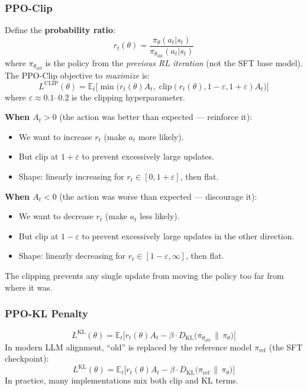 \documentclass[11pt, a4paper]{article}
\begin{document}
\subsubsection{PPO-Clip}

\begin{mathbox}
Define the \textbf{probability ratio}:
\[
r_t(\theta) = \frac{\pi_\theta(a_t | s_t)}{\pi_{\theta_{\text{old}}}(a_t | s_t)}
\]
where $\pi_{\theta_{\text{old}}}$ is the policy from the \emph{previous RL iteration} (not the SFT base model). The PPO-Clip objective to \emph{maximize} is:
\[
L^{\text{CLIP}}(\theta) = \mathbb{E}_t\!\Big[\min\!\big(r_t(\theta) A_t,\; \text{clip}(r_t(\theta), 1-\varepsilon, 1+\varepsilon) A_t\big)\Big]
\]
where $\varepsilon \approx 0.1$--$0.2$ is the clipping hyperparameter.
\end{mathbox}

\begin{notebox}
\textbf{When $A_t > 0$} (the action was better than expected --- reinforce it):
\begin{itemize}[leftmargin=1.5em]
  \item We want to increase $r_t$ (make $a_t$ more likely).
  \item But clip at $1+\varepsilon$ to prevent excessively large updates.
  \item Shape: linearly increasing for $r_t \in [0, 1+\varepsilon]$, then flat.
\end{itemize}

\textbf{When $A_t < 0$} (the action was worse than expected --- discourage it):
\begin{itemize}[leftmargin=1.5em]
  \item We want to decrease $r_t$ (make $a_t$ less likely).
  \item But clip at $1-\varepsilon$ to prevent excessively large updates in the other direction.
  \item Shape: linearly decreasing for $r_t \in [1-\varepsilon, \infty]$, then flat.
\end{itemize}
The clipping prevents any single update from moving the policy too far from where it was.
\end{notebox}

\subsubsection{PPO-KL Penalty}

\begin{mathbox}
\[
L^{\text{KL}}(\theta) = \mathbb{E}_t\!\Big[r_t(\theta) A_t - \beta \cdot D_{\text{KL}}\!\big(\pi_{\theta_{\text{old}}} \,\|\, \pi_\theta\big)\Big]
\]
In modern LLM alignment, ``old'' is replaced by the reference model $\pi_{\text{ref}}$ (the SFT checkpoint):
\[
L^{\text{KL}}(\theta) = \mathbb{E}_t\!\Big[r_t(\theta) A_t - \beta \cdot D_{\text{KL}}\!\big(\pi_{\text{ref}} \,\|\, \pi_\theta\big)\Big]
\]
In practice, many implementations mix both clip and KL terms.
\end{mathbox}
\end{document}

